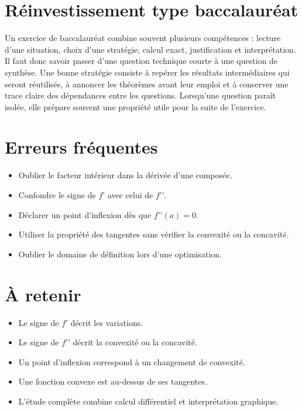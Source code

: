 \section{Réinvestissement type baccalauréat}
Un exercice de baccalauréat combine souvent plusieurs compétences : lecture d'une situation, choix d'une stratégie, calcul exact, justification et interprétation. Il faut donc savoir passer d'une question technique courte à une question de synthèse. Une bonne stratégie consiste à repérer les résultats intermédiaires qui seront réutilisés, à annoncer les théorèmes avant leur emploi et à conserver une trace claire des dépendances entre les questions. Lorsqu'une question paraît isolée, elle prépare souvent une propriété utile pour la suite de l'exercice.

\section{Erreurs fréquentes}
\begin{itemize}
\item Oublier le facteur intérieur dans la dérivée d’une composée.
\item Confondre le signe de $f’$ avec celui de $f’’$.
\item Déclarer un point d’inflexion dès que $f’’(a)=0$.
\item Utiliser la propriété des tangentes sans vérifier la convexité ou la concavité.
\item Oublier le domaine de définition lors d’une optimisation.
\end{itemize}

\section{À retenir}
\begin{aretenir}
\begin{itemize}
\item Le signe de $f’$ décrit les variations.
\item Le signe de $f’’$ décrit la convexité ou la concavité.
\item Un point d’inflexion correspond à un changement de convexité.
\item Une fonction convexe est au-dessus de ses tangentes.
\item L’étude complète combine calcul différentiel et interprétation graphique.
\end{itemize}
\end{aretenir}
